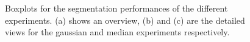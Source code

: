 \documentclass[journal]{IEEEtran}
\begin{document}
\begin{figure}[!h]
\centering
{}
\hfil
{}
\hfil
{}
\caption{Boxplots for the segmentation performances of the different experiments. (a) shows an overview, (b) and (c) are the detailed views for the gaussian and median experiments respectively.}
\label{fig:result}
\end{figure}
\end{document}
